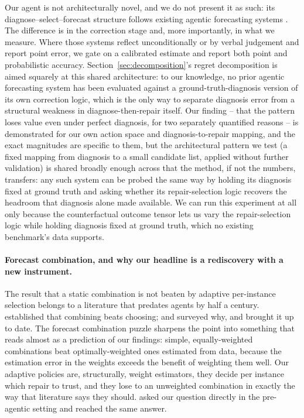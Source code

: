 Our agent is not architecturally novel, and we do not present it as such: its
diagnose--select--forecast structure follows existing agentic forecasting systems
\citep{tsscientist2025,nexus2026,castflow2026}. The difference is in the correction stage
and, more importantly, in what we measure. Where those systems reflect unconditionally or
by verbal judgement and report point error, we gate on a calibrated estimate and report
both point and probabilistic accuracy. Section~\ref{sec:decomposition}'s regret
decomposition is aimed squarely at this shared architecture: to our knowledge, no prior
agentic forecasting system has been evaluated against a ground-truth-diagnosis version of
its own correction logic, which is the only way to separate diagnosis error from a
structural weakness in diagnose-then-repair itself. Our finding -- that the pattern loses value even under perfect diagnosis, for two
separately quantified reasons -- is demonstrated for our own action space and
diagnosis-to-repair mapping, and the exact magnitudes are specific to them, but the
architectural pattern we test (a fixed mapping from diagnosis to a small candidate list,
applied without further validation) is shared broadly enough across
\citep{tsscientist2025,nexus2026,castflow2026} that the method, if not the numbers,
transfers: any such system can be probed the same way by holding its diagnosis fixed at
ground truth and asking whether its repair-selection logic recovers the headroom that
diagnosis alone made available. We can run this experiment at all only because the
counterfactual outcome tensor lets us vary the repair-selection logic while holding
diagnosis fixed at ground truth, which no existing benchmark's data supports.

\paragraph{Forecast combination, and why our headline is a rediscovery with a new
instrument.}
The result that a static combination is not beaten by adaptive per-instance selection
belongs to a literature that predates agents by half a century. \citet{bates1969}
established that combining beats choosing; \citet{clemen1989} and \citet{timmermann2006}
surveyed why, and \citet{wang2023review} brought it up to date. The forecast combination
puzzle \citep{stockwatson2004,smithwallis2009,claeskens2016} sharpens the point into
something that reads almost as a prediction of our findings: simple, equally-weighted
combinations beat optimally-weighted ones estimated from data, because the estimation
error in the weights exceeds the benefit of weighting them well. Our adaptive policies
are, structurally, weight estimators, they decide per instance which repair to trust, and they lose to an unweighted combination in exactly the way that literature says
they should. \citet{hibon2005} asked our question directly in the pre-agentic setting and
reached the same answer.

